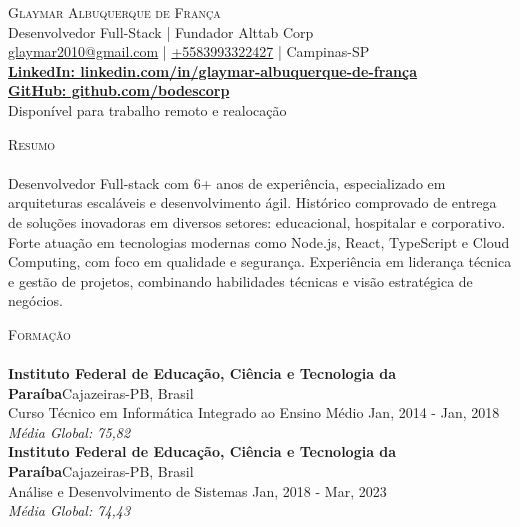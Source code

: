\documentclass[a4paper]{article}
\newcommand{\lineunder}{
    \vspace*{-8pt} \\
    \hspace*{-18pt} \hrulefill \\
}
\newcommand{\header}[1]{
    {\hspace*{-18pt}\vspace*{6pt} \textsc{#1}}
    \vspace*{-6pt} \lineunder
}
\begin{document}
\vspace*{-40pt}

%
%
\begin{center}
    {\Huge \scshape {Glaymar Albuquerque de França}}\\
    \vspace*{2pt}
    {Desenvolvedor Full-Stack | Fundador Alttab Corp}\\
    \vspace*{2pt}
    \href{mailto:glaymar2010@gmail.com}{glaymar2010@gmail.com} | \href{https://wa.me/+5583993322427}{+5583993322427} | Campinas-SP\\
    \vspace*{2pt}
    \textbf{\href{https://www.linkedin.com/in/glaymar-albuquerque-de-fran\%C3\%A7a/}{LinkedIn: linkedin.com/in/glaymar-albuquerque-de-frança }} \\
    \textbf{\href{https://github.com/bodescorp}{GitHub: github.com/bodescorp }} \\
    \vspace*{2pt}
    {Disponível para trabalho remoto e realocação} \\
\end{center}

%
%
\header{Resumo}
\vspace{2mm}
Desenvolvedor Full-stack com 6+ anos de experiência, especializado em arquiteturas escaláveis e desenvolvimento ágil. 
Histórico comprovado de entrega de soluções inovadoras em diversos setores: educacional, hospitalar e corporativo. 
Forte atuação em tecnologias modernas como Node.js, React, TypeScript e Cloud Computing, com foco em qualidade e segurança.
Experiência em liderança técnica e gestão de projetos, combinando habilidades técnicas e visão estratégica de negócios.

%
%
\header{Formação}
\vspace{2mm}
\textbf{Instituto Federal de Educação, Ciência e Tecnologia da Paraíba}\hfill Cajazeiras-PB, Brasil\\
Curso Técnico em Informática Integrado ao Ensino Médio \hfill Jan, 2014 - Jan, 2018\\
{\sl Média Global: 75,82}\\
\vspace{2mm}
\textbf{Instituto Federal de Educação, Ciência e Tecnologia da Paraíba}\hfill Cajazeiras-PB, Brasil\\
Análise e Desenvolvimento de Sistemas \hfill Jan, 2018 - Mar, 2023\\
{\sl Média Global: 74,43}\\
\vspace{2mm}
\end{document}
